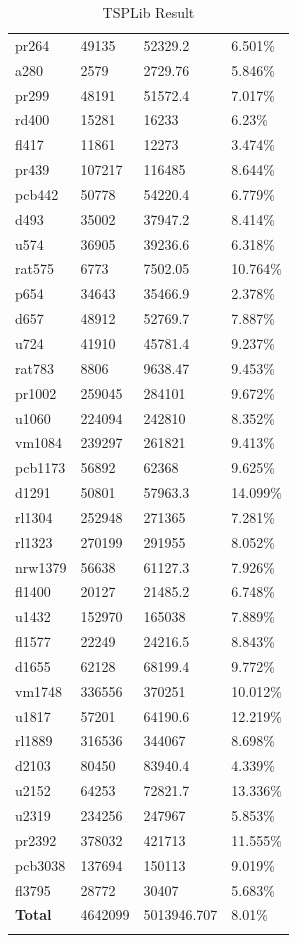 \begin{longtable}{|p{}|p{}|p{}|p{}|}
pr264 & 49135 & 52329.2 & 6.501\%  \\ 
a280 & 2579 & 2729.76 & 5.846\%  \\ \myrowcolour
pr299 & 48191 & 51572.4 & 7.017\%  \\ 
rd400 & 15281 & 16233 & 6.23\%  \\ \myrowcolour
fl417 & 11861 & 12273 & 3.474\%  \\ 
pr439 & 107217 & 116485 & 8.644\%  \\ \myrowcolour
pcb442 & 50778 & 54220.4 & 6.779\%  \\ 
d493 & 35002 & 37947.2 & 8.414\%  \\ \myrowcolour
u574 & 36905 & 39236.6 & 6.318\%  \\ 
rat575 & 6773 & 7502.05 & 10.764\%  \\ \myrowcolour
p654 & 34643 & 35466.9 & 2.378\%  \\ 
d657 & 48912 & 52769.7 & 7.887\%  \\ \myrowcolour
u724 & 41910 & 45781.4 & 9.237\%  \\ 
rat783 & 8806 & 9638.47 & 9.453\%  \\ \myrowcolour
pr1002 & 259045 & 284101 & 9.672\%  \\ 
u1060 & 224094 & 242810 & 8.352\%  \\ \myrowcolour
vm1084 & 239297 & 261821 & 9.413\%  \\ 
pcb1173 & 56892 & 62368 & 9.625\%  \\ \myrowcolour
d1291 & 50801 & 57963.3 & 14.099\%  \\ 
rl1304 & 252948 & 271365 & 7.281\%  \\ \myrowcolour
rl1323 & 270199 & 291955 & 8.052\%  \\ 
nrw1379 & 56638 & 61127.3 & 7.926\%  \\ \myrowcolour
fl1400 & 20127 & 21485.2 & 6.748\%  \\ 
u1432 & 152970 & 165038 & 7.889\%  \\ \myrowcolour
fl1577 & 22249 & 24216.5 & 8.843\%  \\ 
d1655 & 62128 & 68199.4 & 9.772\%  \\ \myrowcolour
vm1748 & 336556 & 370251 & 10.012\%  \\ 
u1817 & 57201 & 64190.6 & 12.219\%  \\ \myrowcolour
rl1889 & 316536 & 344067 & 8.698\%  \\ 
d2103 & 80450 & 83940.4 & 4.339\%  \\ \myrowcolour
u2152 & 64253 & 72821.7 & 13.336\%  \\ 
u2319 & 234256 & 247967 & 5.853\%  \\ \myrowcolour
pr2392 & 378032 & 421713 & 11.555\%  \\ 
pcb3038 & 137694 & 150113 & 9.019\%  \\ \myrowcolour
fl3795 & 28772 & 30407 & 5.683\%  \\ \hline
\textbf{Total} & 4642099 & 5013946.707 & 8.01\% \\ \hline 
\caption{TSPLib Result}
\label{tab:TSPLibResult}
\end{longtable}
